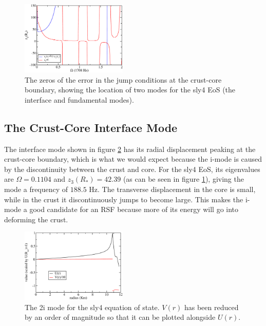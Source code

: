\documentclass[fleqn,usenatbib]{mnras}
\begin{document}
\begin{figure}
\centering
\includegraphics[width=0.45\textwidth,angle=0]{minima_new}
\caption{The zeros of the error in the jump conditions at the crust-core boundary, showing the location of two modes for the sly4 EoS (the interface and fundamental modes).}
\label{fig:trace_minima}
\end{figure}







\subsection{The Crust-Core Interface Mode}
\hspace{\parindent}The interface mode shown in figure \ref{fig:imode_sly4} has its radial displacement peaking at the crust-core boundary, which is what we would expect because the i-mode is caused by the discontinuity between the crust and core. For the sly4 EoS, its eigenvalues are $\Omega=0.1104$ and $z_3(R_*)=42.39$ (as can be seen in figure \ref{fig:trace_minima}), giving the mode a frequency of $188.5$ Hz. The transverse displacement in the core is small, while in the crust it discontinuously jumps to become large. This makes the i-mode a good candidate for an RSF because more of its energy will go into deforming the crust.

\begin{figure}
\centering
\includegraphics[width=0.45\textwidth,angle=0]{sly4_imode}
\caption{The 2i mode for the sly4 equation of state. $V(r)$ has been reduced by an order of magnitude so that it can be plotted alongside $U(r)$.}
\label{fig:imode_sly4}
\end{figure}
\end{document}
